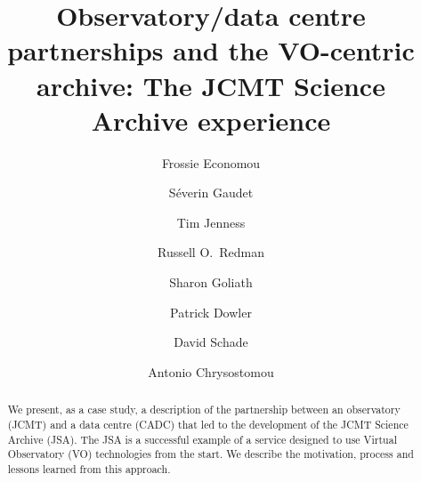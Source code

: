 \documentclass[final,authoryear,5p,times,twocolumn]{elsarticle}
\begin{document}
\begin{frontmatter}



\title{Observatory/data centre partnerships and the VO-centric archive:
  The JCMT Science Archive experience}


\author[lsst]{Frossie Economou}
\author[cadc]{S\'{e}verin Gaudet}
\author[cornell,jac]{Tim Jenness}
\author[jac]{Russell O.\ Redman}
\author[cadc]{Sharon Goliath}
\author[cadc]{Patrick Dowler}
\author[cadc]{David Schade}
\author[uherts,jac]{Antonio Chrysostomou}



\address[lsst]{LSST Project Office, 933 N.\ Cherry Ave, Tucson, AZ 85721, USA}
\address[cadc]{Canadian Astronomy Data Centre, National Research Council of Canada, 5071 West Saanich Road., Victoria, BC V9E 2E7, Canada}
\address[cornell]{Department of Astronomy, Cornell University, Ithaca,
  NY 14853, USA}
\address[jac]{Joint Astronomy Centre, 660 N.\ A`oh\=ok\=u Place, Hilo, HI
  96720, USA}
\address[uherts]{Centre for Astrophysics Research, University of Hertfordshire, College Lane, Hatfield, Hertfordshire AL10 9AB, UK}

\begin{abstract}

  We present, as a case study, a description of the
  partnership between an observatory (JCMT) and a data centre (CADC)
  that led to the development of the JCMT Science Archive (JSA). The
  JSA is a successful example of a service designed to use Virtual Observatory (VO)
  technologies from the start. We describe the motivation, process and
  lessons learned from this approach.


\end{abstract}
\end{frontmatter}
\end{document}
